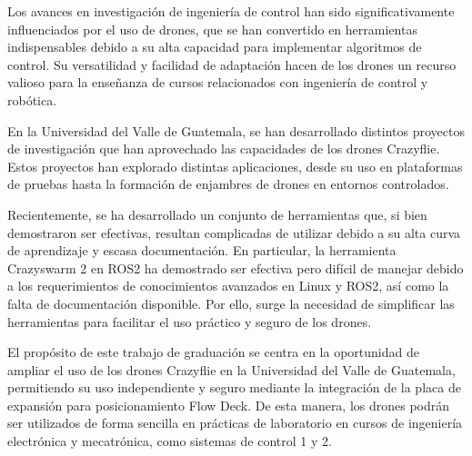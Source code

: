 Los avances en investigación de ingeniería de control han sido significativamente influenciados por el uso de drones, que se han convertido en herramientas indispensables debido a su alta capacidad para implementar algoritmos de control. Su versatilidad y facilidad de adaptación hacen de los drones un recurso valioso para la enseñanza de cursos relacionados con ingeniería de control y robótica. 

En la Universidad del Valle de Guatemala, se han desarrollado distintos proyectos de investigación que han aprovechado las capacidades de los drones Crazyflie. Estos proyectos han explorado distintas aplicaciones, desde su uso en plataformas de pruebas hasta la formación de enjambres de drones en entornos controlados. 

Recientemente, se ha desarrollado un conjunto de herramientas que, si bien demostraron ser efectivas, resultan complicadas de utilizar debido a su alta curva de aprendizaje y escasa documentación. En particular, la herramienta Crazyswarm 2 en ROS2 ha demostrado ser efectiva pero difícil de manejar debido a los requerimientos de conocimientos avanzados en Linux y ROS2, así como la falta de documentación disponible. Por ello, surge la necesidad de simplificar las herramientas para facilitar el uso práctico y seguro de los drones.

El propósito de este trabajo de graduación se centra en la oportunidad de ampliar el uso de los drones Crazyflie en la Universidad del Valle de Guatemala, permitiendo su uso independiente y seguro mediante la integración de la placa de expansión para posicionamiento Flow Deck. De esta manera, los drones podrán ser utilizados de forma sencilla en prácticas de laboratorio en cursos de ingeniería electrónica y mecatrónica, como sistemas de control 1 y 2.  
